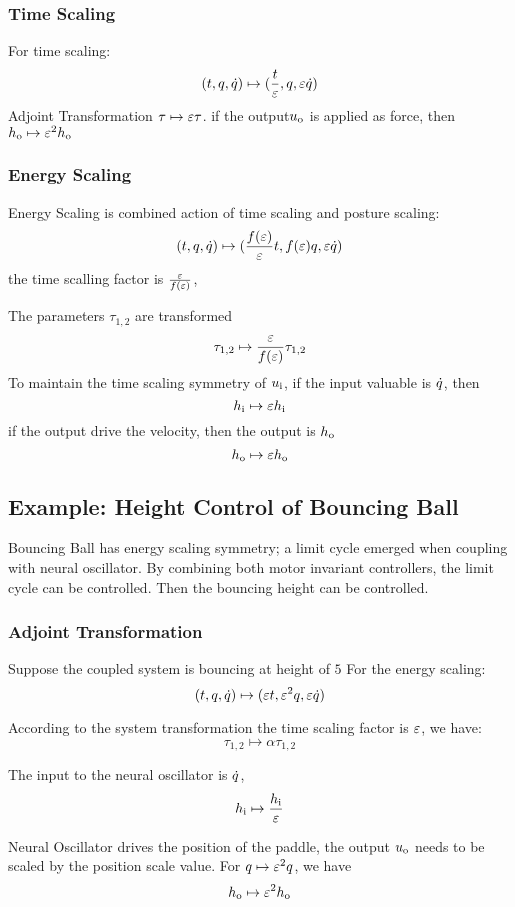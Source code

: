 \subsubsection*{Time Scaling}
For time scaling:
\[
(t,q,\dot{q}) \mapsto (\frac{t}{\varepsilon},q,\varepsilon \dot{q})
\]
Adjoint Transformation
$\tau \mapsto \varepsilon \tau $.
if the output$u_{\mathrm{o}}$ is applied as force, then $h_{\mathrm{o}} \mapsto \varepsilon^2 h_{\mathrm{o}}$

\subsubsection*{ Energy Scaling}
Energy Scaling is combined action of time scaling and posture scaling:
\[
(t,q,\dot{q} ) \mapsto ( \frac{f(\varepsilon)}{\varepsilon}t ,f(\varepsilon)q,\varepsilon\dot{q})
\]
the time scalling factor is $\frac{\varepsilon}{f(\varepsilon)}$, 

The parameters $\tau_{1,2}$ are transformed
\[
\tau_{1,2} \mapsto \frac{\varepsilon}{f(\varepsilon)} \tau_{1,2}
\]
To maintain the time scaling symmetry of $u_{\mathrm{i}}$, if the input valuable is $\dot{q}$, 
then 
\[
h_{\mathrm{i}} \mapsto \varepsilon h_{\mathrm{i}}
\]
if the output drive the velocity, then the output is $h_{\mathrm{o}}$
\[
h_{\mathrm{o}} \mapsto \varepsilon h_{\mathrm{o}}
\]




\subsection{Example: Height Control of Bouncing Ball}

Bouncing Ball has energy scaling symmetry; a limit cycle emerged when coupling with neural oscillator.
By combining both motor invariant controllers, the limit cycle can be controlled.
Then the bouncing height can be controlled.

\subsubsection*{Adjoint Transformation}
Suppose the coupled system is bouncing at height of $5$
For the energy scaling:
\[
(t,q,\dot{q} ) \mapsto ( \varepsilon t ,\varepsilon^2 q,\varepsilon \dot{q})
\]

According to the system transformation
the time scaling factor is $\varepsilon$, we have:
\[
\tau_{1,2} \mapsto \alpha \tau_{1,2}
\]

The input to the neural oscillator is $\dot{q}$,
\[
h_{\mathrm{i}} \mapsto \frac{h_{\mathrm{i}}}{\varepsilon}
\]
 
Neural Oscillator drives the position of the paddle, the output $u_{\mathrm{o}}$ needs to be scaled by the position scale value.
For $q \mapsto \varepsilon^2q$, we have
\[
 h_{\mathrm{o}} \mapsto \varepsilon^2 h_{\mathrm{o}}
\]

